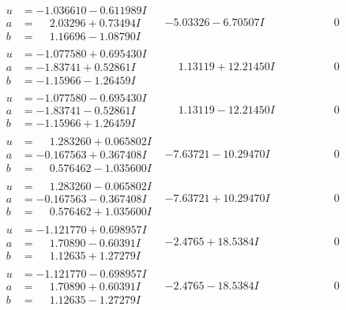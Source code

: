 \documentclass[1p]{elsarticle_modified}
\theoremstyle{definition}
\begin{document}
$$\begin{array}{c|c|c}
\begin{aligned}
u &= -1.036610 - 0.611989 I \\
a &= \phantom{-}2.03296 + 0.73494 I \\
b &= \phantom{-}1.16696 - 1.08790 I\end{aligned}
 & -5.03326 - 6.70507 I & \phantom{-0.000000 } 0 \\ \hline\begin{aligned}
u &= -1.077580 + 0.695430 I \\
a &= -1.83741 + 0.52861 I \\
b &= -1.15966 - 1.26459 I\end{aligned}
 & \phantom{-}1.13119 + 12.21450 I & \phantom{-0.000000 } 0 \\ \hline\begin{aligned}
u &= -1.077580 - 0.695430 I \\
a &= -1.83741 - 0.52861 I \\
b &= -1.15966 + 1.26459 I\end{aligned}
 & \phantom{-}1.13119 - 12.21450 I & \phantom{-0.000000 } 0 \\ \hline\begin{aligned}
u &= \phantom{-}1.283260 + 0.065802 I \\
a &= -0.167563 + 0.367408 I \\
b &= \phantom{-}0.576462 - 1.035600 I\end{aligned}
 & -7.63721 - 10.29470 I & \phantom{-0.000000 } 0 \\ \hline\begin{aligned}
u &= \phantom{-}1.283260 - 0.065802 I \\
a &= -0.167563 - 0.367408 I \\
b &= \phantom{-}0.576462 + 1.035600 I\end{aligned}
 & -7.63721 + 10.29470 I & \phantom{-0.000000 } 0 \\ \hline\begin{aligned}
u &= -1.121770 + 0.698957 I \\
a &= \phantom{-}1.70890 - 0.60391 I \\
b &= \phantom{-}1.12635 + 1.27279 I\end{aligned}
 & -2.4765 + 18.5384 I & \phantom{-0.000000 } 0 \\ \hline\begin{aligned}
u &= -1.121770 - 0.698957 I \\
a &= \phantom{-}1.70890 + 0.60391 I \\
b &= \phantom{-}1.12635 - 1.27279 I\end{aligned}
 & -2.4765 - 18.5384 I & \phantom{-0.000000 } 0 \\ \hline\begin{aligned}

\end{aligned}
\end{array}$$
\end{document}
